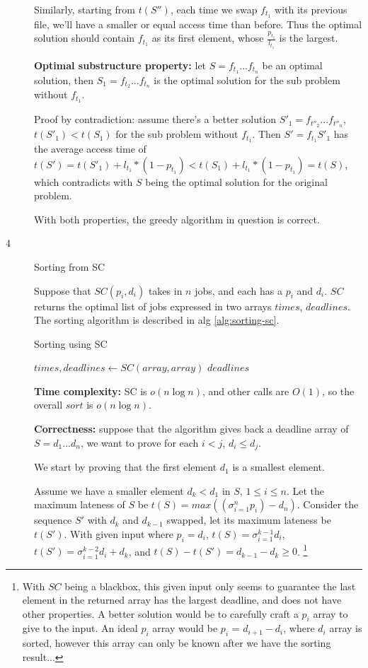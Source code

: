 \documentclass{article}
\begin{document}
\begin{description}
  Similarly, starting from $t(S'')$, each time we swap $f_{t_1}$ with its previous file, we'll have a smaller or equal access time than before. Thus the optimal solution should contain $f_{t_1}$ as its first element, whose $\frac{p_{t_1}}{l_{t_1}}$ is the largest.

  \textbf{Optimal substructure property:} let $S=f_{t_1}...f_{t_n}$ be an optimal solution, then $S_1=f_{t_2}...f_{t_n}$ is the optimal solution for the sub problem without $f_{t_1}$.

  Proof by contradiction: assume there's a better solution $S'_1=f_{t''_2}...f_{t''_n}$, $t(S'_1)<t(S_1)$ for the sub problem without $f_{t_1}$. Then $S'=f_{t_1}S'_1$ has the average access time of $t(S')=t(S'_1) + l_{t_1} * (1-p_{t_1}) < t(S_1) + l_{t_1} * (1-p_{t_1}) = t(S)$, which contradicts with $S$ being the optimal solution for the original problem.

  With both properties, the greedy algorithm in question is correct.

\item[4]{Sorting from SC}
  
  Suppose that $SC(p_i, d_i)$ takes in $n$ jobs, and each has a $p_i$ and $d_i$. $SC$ returns the optimal list of jobs expressed in two arrays $times$, $deadlines$. The sorting algorithm is described in alg \ref{alg:sorting-sc}.

  \begin{algorithm}[h]
  \caption{Sorting using SC}
  \label{alg:sorting-sc}
    \begin{algorithmic}[1]
  
      \State $times, deadlines \gets SC(array, array)$
      \State \Return $deadlines$
    \EndFunction
    
    \end{algorithmic}
  \end{algorithm}

  \textbf{Time complexity:} SC is $o(n \log n)$, and other calls are $O(1)$, so the overall $sort$ is $o(n \log n)$.

  \textbf{Correctness:} suppose that the algorithm gives back a deadline array of $S=d_1...d_n$, we want to prove for each $i<j$, $d_i \leq d_j$.

  We start by proving that the first element $d_1$ is a smallest element. 

  Assume we have a smaller element $d_k < d_1$ in $S$, $1 \leq i \leq n$. Let the maximum lateness of $S$ be $t(S) = max((\sigma_{i=1}^{n}{p_i}) - d_n)$. Consider the sequence $S'$ with $d_k$ and $d_{k-1}$ swapped, let its maximum lateness be $t(S')$. With given input where $p_i = d_i$, $t(S) = \sigma_{i=1}^{k-1}{d_i}$, $t(S') = \sigma_{i=1}^{k-2}{d_i} + d_k$, and $t(S) - t(S') = d_{k-1} - d_k \geq 0$. \footnote{With $SC$ being a blackbox, this given input only seems to guarantee the last element in the returned array has the largest deadline, and does not have other properties. A better solution would be to carefully craft a $p_i$ array to give to the input. An ideal $p_i$ array would be $p_i$ = $d_{i+1} - d_i$, where $d_i$ array is sorted, however this array can only be known after we have the sorting result...}


\end{description}
\end{document}
